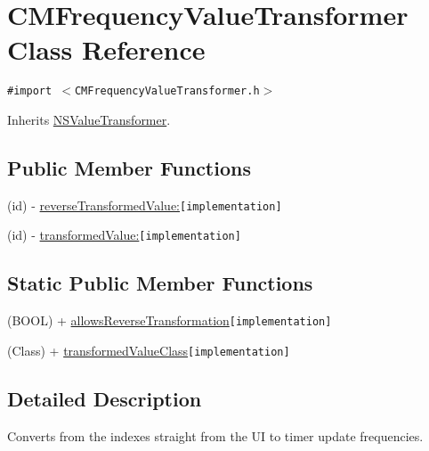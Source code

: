 \hypertarget{interface_c_m_frequency_value_transformer}{
\section{CMFrequencyValueTransformer Class Reference}
\label{interface_c_m_frequency_value_transformer}
}
{\tt \#import $<$CMFrequencyValueTransformer.h$>$}

Inherits \hyperlink{class_n_s_value_transformer}{NSValueTransformer}.

\subsection*{Public Member Functions}
\begin{CompactItemize}
\item 
(id) - \hyperlink{interface_c_m_frequency_value_transformer_fc3df245b308f4b560e4d58d81e28dbc}{reverseTransformedValue:}{\tt  \mbox{[}implementation\mbox{]}}
\item 
(id) - \hyperlink{interface_c_m_frequency_value_transformer_f3b66c64c429e90503d17974995e212c}{transformedValue:}{\tt  \mbox{[}implementation\mbox{]}}
\end{CompactItemize}
\subsection*{Static Public Member Functions}
\begin{CompactItemize}
\item 
(BOOL) + \hyperlink{interface_c_m_frequency_value_transformer_7daf45379423d038cf451c0bdd22cfbe}{allowsReverseTransformation}{\tt  \mbox{[}implementation\mbox{]}}
\item 
(Class) + \hyperlink{interface_c_m_frequency_value_transformer_80cd9a0a3b46f2657044c2b1e5c67778}{transformedValueClass}{\tt  \mbox{[}implementation\mbox{]}}
\end{CompactItemize}


\subsection{Detailed Description}
Converts from the indexes straight from the UI to timer update frequencies. 

